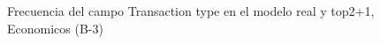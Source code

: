 \begin{figure}[H]
    \centering
    
    \caption{Frecuencia del campo Transaction type en el modelo real y top2+1, Economicos (B-3)}
    \label{frecuency-Transaction Type-top2+1}
\end{figure}